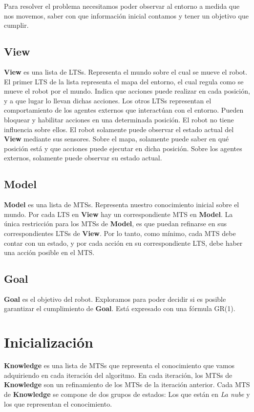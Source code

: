 Para resolver el problema necesitamos poder observar al entorno a medida que nos movemos, saber con que información inicial 
contamos y tener un objetivo que cumplir.

\subsection{View}
\textbf{View} es una lista de LTSs. Representa el mundo sobre el cual se mueve el robot. 
El primer LTS de la lista representa el mapa del entorno, el cual regula como se mueve el robot por el mundo. Indica que acciones 
puede realizar en cada posición, y a que lugar lo llevan dichas acciones. 
Los otros LTSs representan el comportamiento de los agentes externos que interactúan con el entorno. Pueden bloquear y habilitar 
acciones en una determinada posición. El robot no tiene influencia sobre ellos. 
El robot solamente puede observar el estado actual del \textbf{View} mediante sus sensores. Sobre el mapa, solamente puede saber en qué posición 
está y que acciones puede ejecutar en dicha posición. Sobre los agentes externos, solamente puede observar su estado actual.

\subsection{Model}
\textbf{Model} es una lista de MTSs. Representa nuestro conocimiento inicial sobre el mundo. Por cada LTS en \textbf{View} hay un correspondiente MTS 
en \textbf{Model}. 
La única restricción para los MTSs de \textbf{Model}, es que puedan refinarse en sus correspondientes LTSs de \textbf{View}. Por lo tanto, como mínimo, 
cada MTS debe contar con un estado, y por cada acción en su correspondiente LTS, debe haber una acción posible en el MTS.

\subsection{Goal}
\textbf{Goal} es el objetivo del robot. Exploramos para poder decidir si es posible garantizar el cumplimiento de \textbf{Goal}. Está expresado con una 
fórmula GR\big(1\big).

\section{Inicialización}

\textbf{Knowledge} es una lista de MTSs que representa el conocimiento que vamos adquiriendo en cada iteración del algoritmo. En cada iteración, los MTSs 
de \textbf{Knowledge} son un refinamiento de los MTSs de la iteración anterior. Cada MTS de \textbf{Knowledge} se compone de dos grupos de estados: Los 
que están en \textit{La nube} y los que representan el conocimiento.


